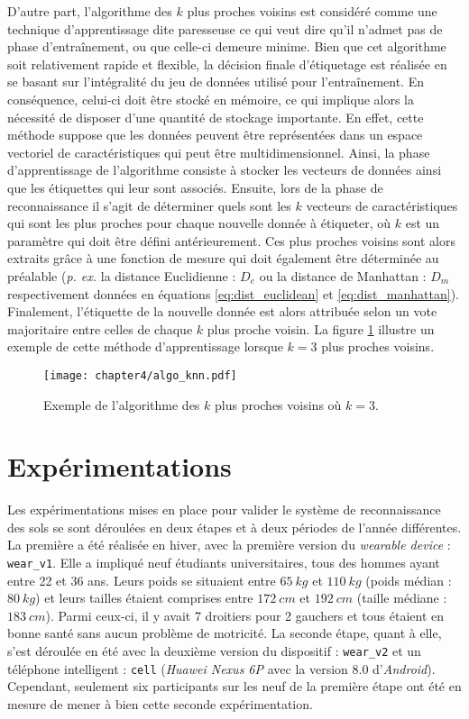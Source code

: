 D'autre part, l'algorithme des $k$ plus proches voisins est considéré comme une technique d'apprentissage dite \og{}paresseuse\fg{} ce qui veut dire qu'il n'admet pas de phase d'entraînement, ou que celle-ci demeure minime. Bien que cet algorithme soit relativement rapide et flexible, la décision finale d'étiquetage est réalisée en se basant sur l'intégralité du jeu de données utilisé pour l'entraînement. En conséquence, celui-ci doit être stocké en mémoire, ce qui implique alors la nécessité de disposer d'une quantité de stockage importante. En effet, cette méthode suppose que les données peuvent être représentées dans un espace vectoriel de caractéristiques qui peut être multidimensionnel. Ainsi, la phase d'apprentissage de l'algorithme consiste à stocker les vecteurs de données ainsi que les étiquettes qui leur sont associés. Ensuite, lors de la phase de reconnaissance il s'agit de déterminer quels sont les $k$ vecteurs de caractéristiques qui sont les plus proches pour chaque nouvelle donnée à étiqueter, où $k$ est un paramètre qui doit être défini antérieurement. Ces plus proches voisins sont alors extraits grâce à une fonction de mesure qui doit également être déterminée au préalable (\textit{p. ex.} la distance Euclidienne : $D_e$ ou la distance de Manhattan : $D_m$ respectivement données en équations \ref{eq:dist_euclidean} et \ref{eq:dist_manhattan}). Finalement, l'étiquette de la nouvelle donnée est alors attribuée selon un vote majoritaire entre celles de chaque $k$ plus proche voisin. La figure \ref{fig:algo_knn} illustre un exemple de cette méthode d'apprentissage lorsque $k=3$ plus proches voisins.

\begin{figure}[t!]
	\centering
	\texttt{[image: chapter4/algo\_knn.pdf]}
        \caption{Exemple de l'algorithme des $k$ plus proches voisins où $k=3$.}
	\label{fig:algo_knn}
\end{figure}

\section{Expérimentations}
\label{sec:expe}

Les expérimentations mises en place pour valider le système de reconnaissance des sols se sont déroulées en deux étapes et à deux périodes de l'année différentes. La première a été réalisée en hiver, avec la première version du \textit{wearable device} : \texttt{wear\_v1}. Elle a impliqué neuf étudiants universitaires, tous des hommes ayant entre 22 et 36 ans. Leurs poids se situaient entre $65\:kg$ et $110\:kg$ (poids médian : $80\:kg$) et leurs tailles étaient comprises entre $172\:cm$ et $192\:cm$ (taille médiane : $183\:cm$). Parmi ceux-ci, il y avait 7 droitiers pour 2 gauchers et tous étaient en bonne santé sans aucun problème de motricité. La seconde étape, quant à elle, s'est déroulée en été avec la deuxième version du dispositif : \texttt{wear\_v2} et un téléphone intelligent : \texttt{cell} (\textit{Huawei Nexus 6P} avec la version $8.0$ d'\textit{Android}). Cependant, seulement six participants sur les neuf de la première étape ont été en mesure de mener à bien cette seconde expérimentation.

